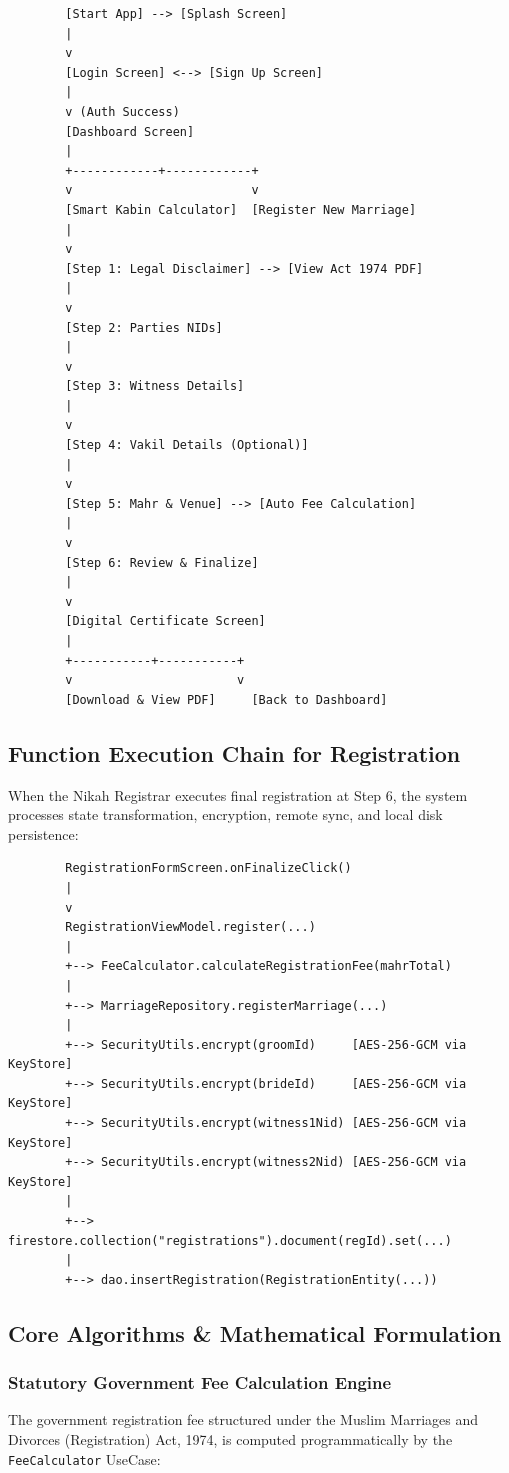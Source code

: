 \documentclass[12pt,a4paper]{article}
\begin{document}
	\begin{lstlisting}
		[Start App] --> [Splash Screen]
		|
		v
		[Login Screen] <--> [Sign Up Screen]
		|
		v (Auth Success)
		[Dashboard Screen]
		|
		+------------+------------+
		v                         v
		[Smart Kabin Calculator]  [Register New Marriage]
		|
		v
		[Step 1: Legal Disclaimer] --> [View Act 1974 PDF]
		|
		v
		[Step 2: Parties NIDs]
		|
		v
		[Step 3: Witness Details]
		|
		v
		[Step 4: Vakil Details (Optional)]
		|
		v
		[Step 5: Mahr & Venue] --> [Auto Fee Calculation]
		|
		v
		[Step 6: Review & Finalize]
		|
		v
		[Digital Certificate Screen]
		|
		+-----------+-----------+
		v                       v
		[Download & View PDF]     [Back to Dashboard]
	\end{lstlisting}
	
	\subsection{Function Execution Chain for Registration}
	When the Nikah Registrar executes final registration at Step 6, the system processes state transformation, encryption, remote sync, and local disk persistence:
	
	\begin{lstlisting}
		RegistrationFormScreen.onFinalizeClick()
		|
		v
		RegistrationViewModel.register(...)
		|
		+--> FeeCalculator.calculateRegistrationFee(mahrTotal)
		|
		+--> MarriageRepository.registerMarriage(...)
		|
		+--> SecurityUtils.encrypt(groomId)     [AES-256-GCM via KeyStore]
		+--> SecurityUtils.encrypt(brideId)     [AES-256-GCM via KeyStore]
		+--> SecurityUtils.encrypt(witness1Nid) [AES-256-GCM via KeyStore]
		+--> SecurityUtils.encrypt(witness2Nid) [AES-256-GCM via KeyStore]
		|
		+--> firestore.collection("registrations").document(regId).set(...)
		|
		+--> dao.insertRegistration(RegistrationEntity(...))
	\end{lstlisting}
	
	\subsection{Core Algorithms \& Mathematical Formulation}
	
	\subsubsection{Statutory Government Fee Calculation Engine}
	The government registration fee structured under the Muslim Marriages and Divorces (Registration) Act, 1974, is computed programmatically by the \texttt{FeeCalculator} UseCase:
	
\end{document}
